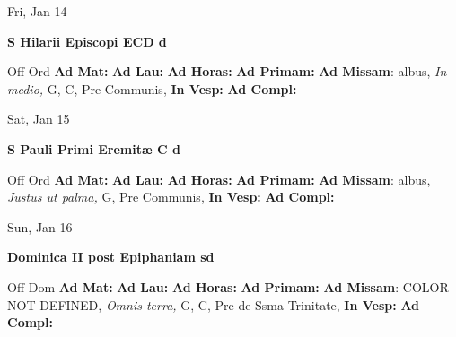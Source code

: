\documentclass[10pt]{memoir}
\begin{document}
\begin{center}
\begin{minipage}{3.5in}
\vspace{2em}
\begin{center}Fri, Jan 14
\end{center}
\textbf{ \large S Hilarii Episcopi ECD
\textnormal{\normalsize d}}

\begin{justify}Off Ord
\textbf{Ad Mat: }
\textbf{Ad Lau: }
\textbf{Ad Horas: }
\textbf{Ad Primam: }\textbf{Ad Missam}: albus, \textit{In medio,} G, C, Pre Communis, 
\textbf{In Vesp: }
\textbf{Ad Compl: }
\end{justify}
\end{minipage}
\end{center}

\begin{center}
\begin{minipage}{3.5in}
\vspace{2em}
\begin{center}Sat, Jan 15
\end{center}
\textbf{ \large S Pauli Primi Eremitæ C
\textnormal{\normalsize d}}

\begin{justify}Off Ord
\textbf{Ad Mat: }
\textbf{Ad Lau: }
\textbf{Ad Horas: }
\textbf{Ad Primam: }\textbf{Ad Missam}: albus, \textit{Justus ut palma,} G, Pre Communis, 
\textbf{In Vesp: }
\textbf{Ad Compl: }
\end{justify}
\end{minipage}
\end{center}

\begin{center}
\begin{minipage}{3.5in}
\vspace{2em}
\begin{center}Sun, Jan 16
\end{center}
\textbf{ \large Dominica II post Epiphaniam
\textnormal{\normalsize sd}}

\begin{justify}Off Dom
\textbf{Ad Mat: }
\textbf{Ad Lau: }
\textbf{Ad Horas: }
\textbf{Ad Primam: }\textbf{Ad Missam}: COLOR NOT DEFINED, \textit{Omnis terra,} G, C, Pre de Ssma Trinitate, 
\textbf{In Vesp: }
\textbf{Ad Compl: }
\end{justify}
\end{minipage}
\end{center}
\end{document}
